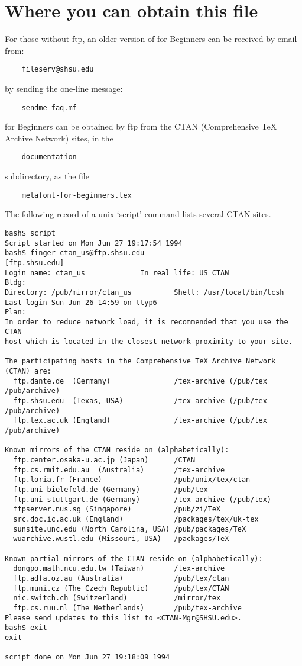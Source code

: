 \section*{Where you can obtain this file}\label{sec:CTAN}%

For those without ftp, an older version of \MF{} for Beginners can be
received by email from:
\begin{verbatim}
    fileserv@shsu.edu
\end{verbatim}
by sending the one-line message:
\begin{verbatim}
    sendme faq.mf
\end{verbatim}

\MF{} for Beginners can be obtained by ftp from the CTAN
(Comprehensive \TeX{} Archive Network) sites, in the
\begin{verbatim}
    documentation
\end{verbatim}
subdirectory, as the file
\begin{verbatim}
    metafont-for-beginners.tex
\end{verbatim}

The following record of a unix `script' command lists several
CTAN sites.

\begin{verbatim}
bash$ script
Script started on Mon Jun 27 19:17:54 1994
bash$ finger ctan_us@ftp.shsu.edu
[ftp.shsu.edu]
Login name: ctan_us   			In real life: US CTAN
Bldg:  			 
Directory: /pub/mirror/ctan_us      	Shell: /usr/local/bin/tcsh
Last login Sun Jun 26 14:59 on ttyp6
Plan:
In order to reduce network load, it is recommended that you use the CTAN
host which is located in the closest network proximity to your site.  

The participating hosts in the Comprehensive TeX Archive Network (CTAN) are:
  ftp.dante.de  (Germany)               /tex-archive (/pub/tex /pub/archive)
  ftp.shsu.edu  (Texas, USA)            /tex-archive (/pub/tex /pub/archive)
  ftp.tex.ac.uk (England)               /tex-archive (/pub/tex /pub/archive)

Known mirrors of the CTAN reside on (alphabetically):
  ftp.center.osaka-u.ac.jp (Japan)      /CTAN
  ftp.cs.rmit.edu.au  (Australia)       /tex-archive
  ftp.loria.fr (France)                 /pub/unix/tex/ctan
  ftp.uni-bielefeld.de (Germany)        /pub/tex
  ftp.uni-stuttgart.de (Germany)        /tex-archive (/pub/tex)
  ftpserver.nus.sg (Singapore)          /pub/zi/TeX
  src.doc.ic.ac.uk (England)            /packages/tex/uk-tex
  sunsite.unc.edu (North Carolina, USA)	/pub/packages/TeX
  wuarchive.wustl.edu (Missouri, USA)   /packages/TeX

Known partial mirrors of the CTAN reside on (alphabetically):
  dongpo.math.ncu.edu.tw (Taiwan)       /tex-archive
  ftp.adfa.oz.au (Australia)            /pub/tex/ctan
  ftp.muni.cz (The Czech Republic)      /pub/tex/CTAN
  nic.switch.ch (Switzerland)           /mirror/tex
  ftp.cs.ruu.nl (The Netherlands)       /pub/tex-archive
Please send updates to this list to <CTAN-Mgr@SHSU.edu>.
bash$ exit
exit

script done on Mon Jun 27 19:18:09 1994
\end{verbatim}


